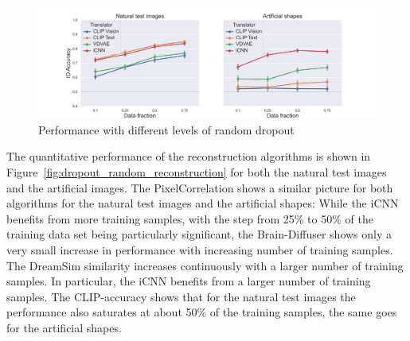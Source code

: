 \begin{figure}[ht]
  \centering
  \includegraphics[width=1\textwidth]{plots/dropout_random_translator.png}
  \caption[Translator Performance with increasing dropout]{ Performance with different levels of random dropout }\label{fig:dropout_random_translator}
\end{figure}

The quantitative performance of the reconstruction algorithms is shown in Figure~\ref{fig:dropout_random_reconstruction} for both the natural test images and the artificial images. The PixelCorrelation shows a similar picture for both algorithms for the natural test images and the artificial shapes: While the iCNN benefits from more training samples, with the step from 25\% to 50\% of the training data set being particularly significant, the Brain-Diffuser shows only a very small increase in performance with increasing number of training samples. The DreamSim similarity increases continuously with a larger number of training samples. In particular, the iCNN benefits from a larger number of training samples. The CLIP-accuracy shows that for the natural test images the performance also saturates at about 50\% of the training samples, the same goes for the artificial shapes.

